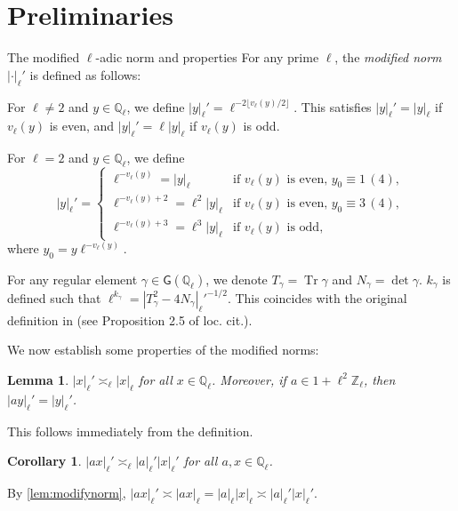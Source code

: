 \documentclass[10pt,oneside,reqno]{amsart}
\makeatletter
\newcommand\QQ{\mathbb{Q}}
\newcommand\ZZ{\mathbb{Z}}
\newcommand\G{\mathsf{G}}
\DeclareMathOperator\Tr{Tr}
\def\subsection{\@startsection{subsection}{2}
  \z@{3pt\@plus0pt}{-.5em}%
  {\normalfont\bfseries}}
\theoremstyle{THEOREM}
\newtheorem{lemma}[theorem]{Lemma}
\newtheorem{corollary}[theorem]{Corollary}
\theoremstyle{DEFINITION}
\theoremstyle{EXERCISE}
\numberwithin{equation}{section}
\renewenvironment{proof}[1][\proofname]{\par
  \vspace{-6pt}
  \pushQED{\qed}
  \normalfont \topsep6\p@\@plus6\p@\relax
  \trivlist
  \item[\hskip\labelsep\rmfamily\bfseries
    #1\@addpunct{:}]\ignorespaces
}{
  \popQED\endtrivlist\@endpefalse
  \vspace{-6pt}
}
\makeatother
\begin{document}
\section{Preliminaries}\label{sec:preliminaries}
\subsection{The modified $\ell$-adic norm and properties}
For any prime $\ell$, the \emph{modified norm} $|\cdot|_\ell'$ is defined as follows: 

For $\ell\neq 2$ and $y\in \QQ_\ell$, we define $|y|_\ell' = \ell^{-2\lfloor v_\ell(y)/2\rfloor}$.  
This satisfies $|y|_\ell' = |y|_\ell$ if $v_\ell(y)$ is even, and $|y|_\ell' = \ell |y|_\ell$ if $v_\ell(y)$ is odd.

For $\ell=2$ and $y\in \QQ_\ell$, we define
\[
|y|_\ell' = \begin{cases}
  \ell^{-v_\ell(y)}=|y|_\ell & \text{if $v_\ell(y)$ is even, $y_0\equiv 1\,(4)$}, \\
  \ell^{-v_\ell(y)+2}=\ell^2|y|_\ell & \text{if $v_\ell(y)$ is even, $y_0\equiv 3\,(4)$}, \\
  \ell^{-v_\ell(y)+3}=\ell^3|y|_\ell & \text{if $v_\ell(y)$ is odd},
\end{cases}
\]
where $y_0=y\ell^{-v_\ell(y)}$.

For any regular element $\gamma\in\G(\QQ_\ell)$, we denote $T_\gamma=\Tr\gamma$ and $N_\gamma=\det\gamma$. $k_\gamma$ is defined such that $\ell^{k_\gamma}=|T_\gamma^2-4N_\gamma|_\ell'^{-1/2}$. This coincides with the original definition in \cite{cheng2025} (see Proposition 2.5 of loc. cit.).

We now establish some properties of the modified norms:
\begin{lemma}\label{lem:modifynorm}
$|x|_\ell'\asymp_\ell |x|_\ell$ for all $x\in \QQ_\ell$. Moreover, if $a\in 1+\ell^2\ZZ_\ell$, then $|ay|_\ell'=|y|_\ell'$.
\end{lemma}
\begin{proof}
This follows immediately from the definition.
\end{proof}

\begin{corollary}
$|ax|_\ell'\asymp_\ell |a|_\ell'|x|_\ell'$ for all $a,x\in \QQ_\ell$.
\end{corollary}
\begin{proof}
By \autoref{lem:modifynorm}, $|ax|_\ell' \asymp |ax|_\ell = |a|_\ell |x|_\ell \asymp |a|_\ell' |x|_\ell'$.
\end{proof}
\end{document}
